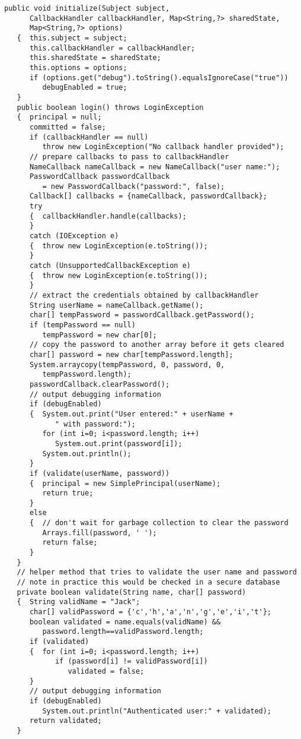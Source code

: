 \begin{lstlisting}[caption=JAAS Login]
   public void initialize(Subject subject,
      CallbackHandler callbackHandler, Map<String,?> sharedState,
      Map<String,?> options)
   {  this.subject = subject;
      this.callbackHandler = callbackHandler;
      this.sharedState = sharedState;
      this.options = options;
      if (options.get("debug").toString().equalsIgnoreCase("true"))
         debugEnabled = true;
   }
   public boolean login() throws LoginException
   {  principal = null;
      committed = false;
      if (callbackHandler == null)
         throw new LoginException("No callback handler provided");
      // prepare callbacks to pass to callbackHandler
      NameCallback nameCallback = new NameCallback("user name:");
      PasswordCallback passwordCallback
         = new PasswordCallback("password:", false);
      Callback[] callbacks = {nameCallback, passwordCallback};
      try
      {  callbackHandler.handle(callbacks);
      }
      catch (IOException e)
      {  throw new LoginException(e.toString());
      }
      catch (UnsupportedCallbackException e)
      {  throw new LoginException(e.toString());
      }
      // extract the credentials obtained by callbackHandler
      String userName = nameCallback.getName();
      char[] tempPassword = passwordCallback.getPassword();
      if (tempPassword == null)
         tempPassword = new char[0];
      // copy the password to another array before it gets cleared
      char[] password = new char[tempPassword.length];
      System.arraycopy(tempPassword, 0, password, 0,
         tempPassword.length);
      passwordCallback.clearPassword();
      // output debugging information
      if (debugEnabled)
      {  System.out.print("User entered:" + userName +
            " with password:");
         for (int i=0; i<password.length; i++)
            System.out.print(password[i]);
         System.out.println();
      }
      if (validate(userName, password))
      {  principal = new SimplePrincipal(userName);
         return true;
      }
      else
      {  // don't wait for garbage collection to clear the password
         Arrays.fill(password, ' ');
         return false;
      }
   }
   // helper method that tries to validate the user name and password
   // note in practice this would be checked in a secure database
   private boolean validate(String name, char[] password)
   {  String validName = "Jack";
      char[] validPassword = {'c','h','a','n','g','e','i','t'};
      boolean validated = name.equals(validName) &&
         password.length==validPassword.length;
      if (validated)
      {  for (int i=0; i<password.length; i++)
            if (password[i] != validPassword[i])
               validated = false;
      }
      // output debugging information
      if (debugEnabled)
         System.out.println("Authenticated user:" + validated);
      return validated;
   }


\end{lstlisting}
